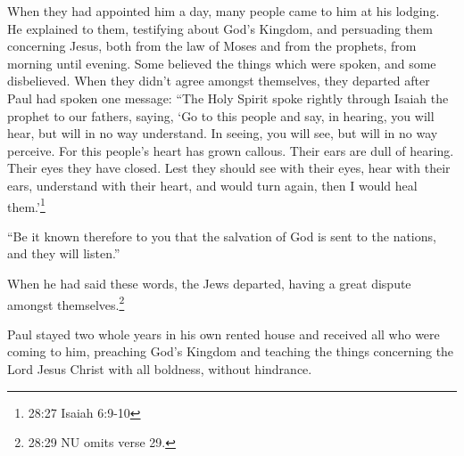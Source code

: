  When they had appointed him a day, many people came to him
at his lodging. He explained to them, testifying about God's Kingdom,
and persuading them concerning Jesus, both from the law of Moses and
from the prophets, from morning until evening.  Some
believed the things which were spoken, and some disbelieved.
 When they didn't agree amongst themselves, they departed
after Paul had spoken one message: ``The Holy Spirit spoke rightly
through Isaiah the prophet to our fathers,  saying, `Go to
this people and say, in hearing, you will hear, but will in no way
understand. In seeing, you will see, but will in no way perceive.
 For this people's heart has grown callous. Their ears are
dull of hearing. Their eyes they have closed. Lest they should see with
their eyes, hear with their ears, understand with their heart, and would
turn again, then I would heal them.'\footnote{28:27 Isaiah 6:9-10}

 ``Be it known therefore to you that the salvation of God
is sent to the nations, and they will listen.''

 When he had said these words, the Jews departed, having a
great dispute amongst themselves.\footnote{28:29 NU omits verse 29.}

 Paul stayed two whole years in his own rented house and
received all who were coming to him,  preaching God's
Kingdom and teaching the things concerning the Lord Jesus Christ with
all boldness, without hindrance.
